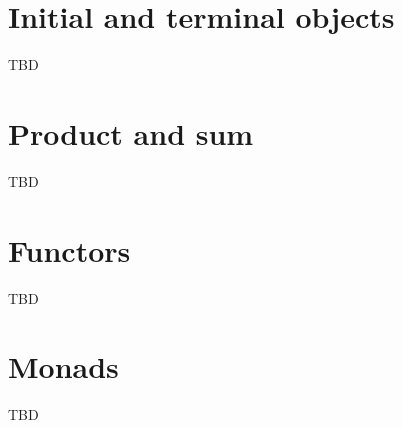 \chapter{Initial and terminal objects}
TBD

\chapter{Product and sum}
TBD

\chapter{Functors}

TBD

\chapter{Monads}

TBD
